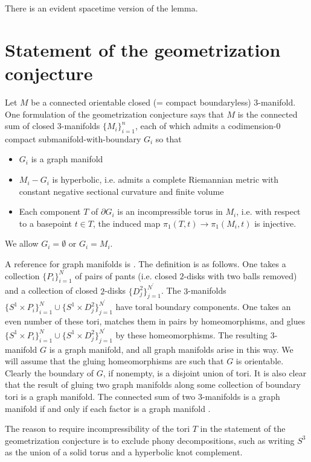There is an evident spacetime version of the lemma.

\section{Statement of the geometrization conjecture} \label{geom}

Let $M$ be a connected orientable closed (= compact boundaryless) $3$-manifold.
One formulation of the geometrization conjecture says that
$M$ is the connected sum of closed $3$-manifolds $\{M_i\}_{i=1}^n$, each of
which admits a codimension-$0$ compact submanifold-with-boundary $G_i$
so that
\begin{itemize}
\item $G_i$ is a graph manifold
\item $M_i - G_i$ is hyperbolic, i.e. admits a
complete Riemannian metric with constant negative sectional curvature
and finite volume
\item Each component $T$ of $\partial G_i$ is an incompressible torus in $M_i$,
i.e. with respect to a basepoint $t \in T$, the induced map
$\pi_1(T, t) \rightarrow \pi_1(M_i, t)$ is injective.
\end{itemize}
We allow $G_i = \emptyset$ or $G_i = M_i$.

A reference for graph manifolds is
\cite[Chapter 2.4]{Matveev}. The definition is as follows.
One takes a collection $\{P_i\}_{i=1}^N$ of pairs of pants
(i.e. closed $2$-disks with two balls removed)
and a collection of closed $2$-disks $\{D^2_j\}_{j=1}^{N^\prime}$. The
$3$-manifolds $\{S^1 \times P_i\}_{i=1}^N
\cup \{S^1 \times D^2_j\}_{j=1}^{N^\prime}$ have toral boundary components.
One takes an even number of these tori, matches them in pairs by
homeomorphisms, and glues $\{S^1 \times P_i\}_{i=1}^N
\cup \{S^1 \times D^2_j\}_{j=1}^{N^\prime}$ by these homeomorphisms.
The
resulting $3$-manifold $G$ is a graph manifold, and all
graph manifolds
arise in this way.
We will assume that the gluing homeomorphisms are such that
$G$ is orientable.
Clearly the boundary of $G$, if nonempty, is a
disjoint union of tori. It is also clear that the result of
gluing two graph manifolds along some collection of boundary tori is
a graph manifold. The connected sum of two $3$-manifolds is a
graph manifold if and only if each factor is a graph manifold
\cite[Proposition 2.4.3]{Matveev}.

The reason to require incompressibility of the tori $T$ in the
statement of the geometrization conjecture is to
exclude phony decompositions, such as writing $S^3$ as the
union of a solid torus and a hyperbolic knot complement.

